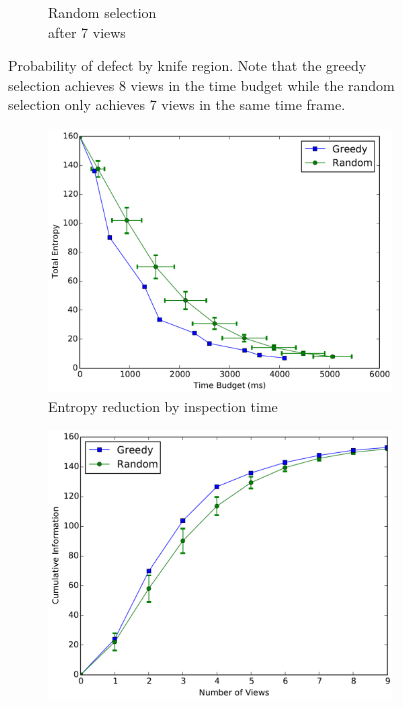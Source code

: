 \documentclass[letterpaper, 10 pt, conference]{ieeeconf}  %
\begin{document}
\begin{figure}
\begin{subfigure}[b]{.24\textwidth}
        \caption{Random selection \\ after 7 views}
        \vspace*{2mm}
        \label{fig:rand7view}
    \end{subfigure}
    \caption{Probability of defect by knife region. Note that the greedy \\ selection achieves 8 views in the time budget while the random \\ selection only achieves 7 views in the same time frame.}
    \label{fig:prob_dists}
\end{figure}

\begin{figure}
    \centering
    \begin{subfigure}[b]{.49\textwidth}
        \centering
        \includegraphics[width=.99\textwidth]{finite_views.png}
        \caption{Entropy reduction by inspection time}
        \vspace*{2mm}
        \label{fig:info_by_time}
    \end{subfigure}
    \hfill
    \begin{subfigure}[b]{.49\textwidth}
        \centering
        {\includegraphics[width=.97\textwidth]{info_gain_views.png}}

\end{subfigure}
\end{figure}
\end{document}
